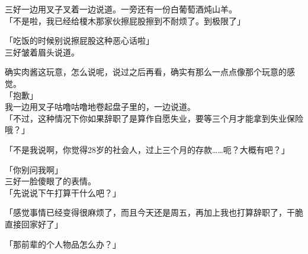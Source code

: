 三好一边用叉子叉着一边说道。一旁还有一份白葡萄酒炖山羊。\\

「不是啦，我已经给榎木那家伙擦屁股擦到不耐烦了。到极限了」

「吃饭的时候别说擦屁股这种恶心话啦」\\

三好皱着眉头说道。

确实肉酱这玩意，怎么说呢，说过之后再看，确实有那么一点点像那个玩意的感觉。\\

「抱歉」\\

我一边用叉子咕噜咕噜地卷起盘子里的，一边说道。\\

「不过，这种情况下你如果辞职了是算作自愿失业，要等三个月才能拿到失业保险哦？」

「不是我说啊，你觉得28岁的社会人，过上三个月的存款……呃？大概有吧？」

「你别问我啊」\\

三好一脸傻眼了的表情。\\

「先说说下午打算干什么吧？」

「感觉事情已经变得很麻烦了，而且今天还是周五，再加上我也打算辞职了，干脆直接回家好了」

「那前辈的个人物品怎么办？」

